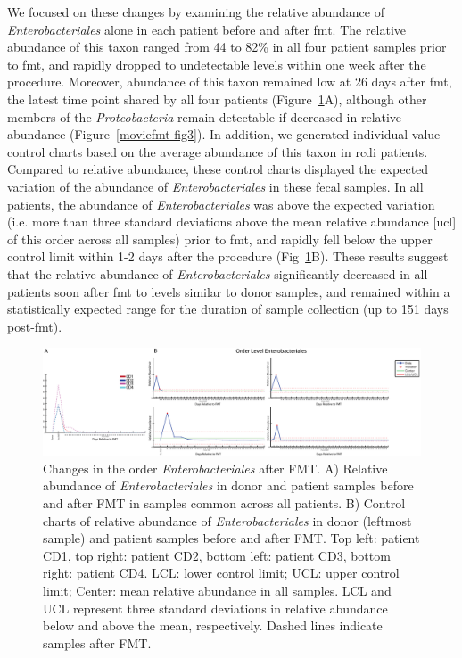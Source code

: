 We focused on these changes by examining the relative abundance of \textit{Enterobacteriales} alone in each patient before and after \gls{fmt}. The relative abundance of this taxon ranged from 44 to 82\% in all four patient samples prior to \gls{fmt}, and rapidly dropped to undetectable levels within one week after the procedure. Moreover, abundance of this taxon remained low at 26 days after \gls{fmt}, the latest time point shared by all four patients (Figure~\ref{moviefmt-fig4}A), although other members of the \textit{Proteobacteria} remain detectable if decreased in relative abundance (Figure~\ref{moviefmt-fig3}). In addition, we generated individual value control charts based on the average abundance of this taxon in \gls{rcdi} patients. Compared to relative abundance, these control charts displayed the expected variation of the abundance of \textit{Enterobacteriales} in these fecal samples. In all patients, the abundance of \textit{Enterobacteriales} was above the expected variation (i.e. more than three standard deviations above the mean relative abundance [\gls{ucl}] of this order across all samples) prior to \gls{fmt}, and rapidly fell below the upper control limit within 1-2 days after the procedure (Fig~\ref{moviefmt-fig4}B). These results suggest that the relative abundance of \textit{Enterobacteriales} significantly decreased in all patients soon after \gls{fmt} to levels similar to donor samples, and remained within a statistically expected range for the duration of sample collection (up to 151 days post-\gls{fmt}).

\begin{figure}
\includegraphics[width=\textheight]{moviefmt-figures/figure-4-small}
\caption[Changes in the order \textit{Enterobacteriales} after FMT.]{Changes in the order \textit{Enterobacteriales} after FMT. A) Relative abundance of \textit{Enterobacteriales} in donor and patient samples before and after FMT in samples common across all patients. B) Control charts of relative abundance of \textit{Enterobacteriales} in donor (leftmost sample) and patient samples before and after FMT. Top left: patient CD1, top right: patient CD2, bottom left: patient CD3, bottom right: patient CD4. LCL: lower control limit; UCL: upper control limit; Center: mean relative abundance in all samples. LCL and UCL represent three standard deviations in relative abundance below and above the mean, respectively. Dashed lines indicate samples after FMT.}
\label{moviefmt-fig4}
\end{figure}

